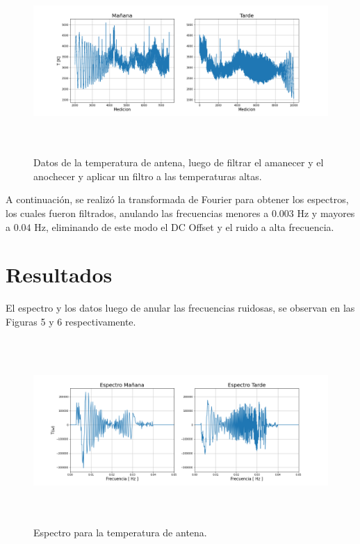 \documentclass[letterpaper,oneside]{article}
\begin{document}
\begin{figure}
  \centering
  \includegraphics[height=7cm]{../graficos/primerfiltro.png}
  \caption{Datos de la temperatura de antena, luego de filtrar el amanecer y el anochecer y aplicar un filtro a las temperaturas altas.}
\end{figure}

A continuación, se realizó la transformada de Fourier para obtener los espectros, los cuales fueron filtrados, anulando las frecuencias menores a $0.003$ Hz y mayores a $0.04$ Hz, eliminando de este modo el DC Offset y el ruido a alta frecuencia.

\section{Resultados}
El espectro y los datos luego de anular las frecuencias ruidosas, se observan en las Figuras 5 y 6 respectivamente.

\begin{figure}
  \centering
  \includegraphics[height=7cm]{../graficos/cleanespectros.png}
  \caption{Espectro para la temperatura de antena.}
\end{figure}
\end{document}

